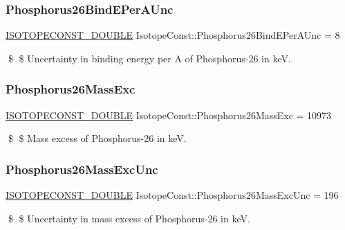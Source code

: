 \subsubsection{\texorpdfstring{Phosphorus26\+Bind\+E\+Per\+A\+Unc}{Phosphorus26BindEPerAUnc}}
{\footnotesize\ttfamily \mbox{\hyperlink{group___isotope_const-_macros_ga8f45a7272ce02c0b4c65c44636ed719a}{I\+S\+O\+T\+O\+P\+E\+C\+O\+N\+S\+T\+\_\+\+D\+O\+U\+B\+LE}} Isotope\+Const\+::\+Phosphorus26\+Bind\+E\+Per\+A\+Unc = 8}

\$ \$ Uncertainty in binding energy per A of Phosphorus-\/26 in keV. \mbox{\label{group___isotope_const-_phosphorus-_p26_ga1d618ff32411305f67c6865d0b99772a}} 
\subsubsection{\texorpdfstring{Phosphorus26\+Mass\+Exc}{Phosphorus26MassExc}}
{\footnotesize\ttfamily \mbox{\hyperlink{group___isotope_const-_macros_ga8f45a7272ce02c0b4c65c44636ed719a}{I\+S\+O\+T\+O\+P\+E\+C\+O\+N\+S\+T\+\_\+\+D\+O\+U\+B\+LE}} Isotope\+Const\+::\+Phosphorus26\+Mass\+Exc = 10973}

\$ \$ Mass excess of Phosphorus-\/26 in keV. \mbox{\label{group___isotope_const-_phosphorus-_p26_ga8a71b0100b3feb072460521511055d77}} 
\subsubsection{\texorpdfstring{Phosphorus26\+Mass\+Exc\+Unc}{Phosphorus26MassExcUnc}}
{\footnotesize\ttfamily \mbox{\hyperlink{group___isotope_const-_macros_ga8f45a7272ce02c0b4c65c44636ed719a}{I\+S\+O\+T\+O\+P\+E\+C\+O\+N\+S\+T\+\_\+\+D\+O\+U\+B\+LE}} Isotope\+Const\+::\+Phosphorus26\+Mass\+Exc\+Unc = 196}

\$ \$ Uncertainty in mass excess of Phosphorus-\/26 in keV. \mbox{\label{group___isotope_const-_phosphorus-_p26_gaa700150e37540b4d4ca31cc734f89f94}} 
